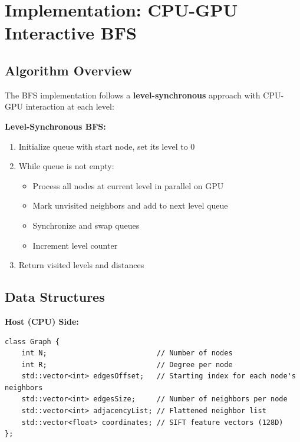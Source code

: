 \documentclass[11pt,a4paper]{article}
\begin{document}
\section{Implementation: CPU-GPU Interactive BFS}

\subsection{Algorithm Overview}

The BFS implementation follows a \textbf{level-synchronous} approach with CPU-GPU interaction at each level:

\begin{tcolorbox}[colback=yellow!5!white,colframe=orange!75!black,title=BFS Algorithm Structure]
\textbf{Level-Synchronous BFS:}
\begin{enumerate}
    \item Initialize queue with start node, set its level to 0
    \item While queue is not empty:
    \begin{itemize}
        \item Process all nodes at current level in parallel on GPU
        \item Mark unvisited neighbors and add to next level queue
        \item Synchronize and swap queues
        \item Increment level counter
    \end{itemize}
    \item Return visited levels and distances
\end{enumerate}
\end{tcolorbox}

\subsection{Data Structures}

\textbf{Host (CPU) Side:}
\begin{lstlisting}[caption={Graph Data Structure (Host)}]
class Graph {
    int N;                          // Number of nodes
    int R;                          // Degree per node
    std::vector<int> edgesOffset;   // Starting index for each node's neighbors
    std::vector<int> edgesSize;     // Number of neighbors per node
    std::vector<int> adjacencyList; // Flattened neighbor list
    std::vector<float> coordinates; // SIFT feature vectors (128D)
};
\end{lstlisting}
\end{document}

